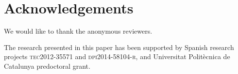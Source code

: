 \documentclass[
  twocolumn,
  5p,
  sort&compress,
]{elsarticle}
\begin{document}












\section*{Acknowledgements}

We would like to thank the anonymous reviewers.

The research presented in this paper has been supported by Spanish
research projects \textsc{tec\small{2012-35571}} and \textsc{dpi\small{2014-58104}-r},
and Universitat Polit\`{e}cnica de Catalunya predoctoral grant.




\end{document}
